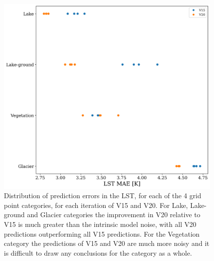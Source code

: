 \documentclass[hess, twostagejnl]{copernicus}
\begin{document}
\begin{figure}
	\includegraphics[width=\columnwidth]{global_shift_plot}
	\caption{Distribution of prediction errors in the LST, for each of the 4 grid point categories, for each iteration of V15 and V20. For Lake, Lake-ground and Glacier categories the improvement in V20 relative to V15 is much greater than the intrinsic model noise, with all V20 predictions outperforming all V15 predictions. For the Vegetation category the predictions of V15 and V20 are much more noisy and it is difficult to draw any conclusions for the category as a whole.} 
	\label{fig:global_shift_plot}
\end{figure}
\end{document}
